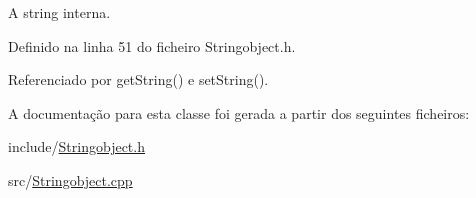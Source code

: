 A string interna. 

Definido na linha 51 do ficheiro Stringobject.\+h.



Referenciado por get\+String() e set\+String().



A documentação para esta classe foi gerada a partir dos seguintes ficheiros\+:\begin{DoxyCompactItemize}
\item 
include/\hyperlink{Stringobject_8h}{Stringobject.\+h}\item 
src/\hyperlink{Stringobject_8cpp}{Stringobject.\+cpp}\end{DoxyCompactItemize}
